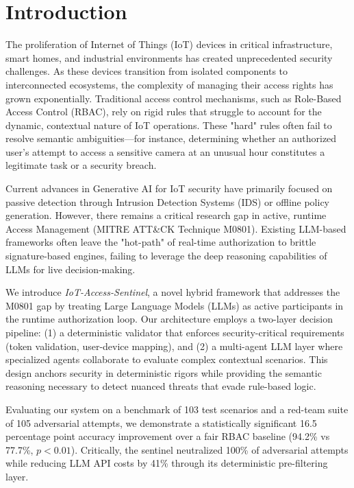 \documentclass[conference]{IEEEtran}
\begin{document}
\section{Introduction}

The proliferation of Internet of Things (IoT) devices in critical infrastructure, smart homes, and industrial environments has created unprecedented security challenges. As these devices transition from isolated components to interconnected ecosystems, the complexity of managing their access rights has grown exponentially. Traditional access control mechanisms, such as Role-Based Access Control (RBAC), rely on rigid rules that struggle to account for the dynamic, contextual nature of IoT operations. These "hard" rules often fail to resolve semantic ambiguities—for instance, determining whether an authorized user's attempt to access a sensitive camera at an unusual hour constitutes a legitimate task or a security breach.

Current advances in Generative AI for IoT security have primarily focused on passive detection through Intrusion Detection Systems (IDS) or offline policy generation. However, there remains a critical research gap in active, runtime Access Management (MITRE ATT\&CK Technique M0801). Existing LLM-based frameworks often leave the "hot-path" of real-time authorization to brittle signature-based engines, failing to leverage the deep reasoning capabilities of LLMs for live decision-making.

We introduce \textit{IoT-Access-Sentinel}, a novel hybrid framework that addresses the M0801 gap by treating Large Language Models (LLMs) as active participants in the runtime authorization loop. Our architecture employs a two-layer decision pipeline: (1) a deterministic validator that enforces security-critical requirements (token validation, user-device mapping), and (2) a multi-agent LLM layer where specialized agents collaborate to evaluate complex contextual scenarios. This design anchors security in deterministic rigors while providing the semantic reasoning necessary to detect nuanced threats that evade rule-based logic.

Evaluating our system on a benchmark of 103 test scenarios and a red-team suite of 105 adversarial attempts, we demonstrate a statistically significant 16.5 percentage point accuracy improvement over a fair RBAC baseline (94.2\% vs 77.7\%, $p < 0.01$). Critically, the sentinel neutralized 100\% of adversarial attempts while reducing LLM API costs by 41\% through its deterministic pre-filtering layer.
\end{document}
